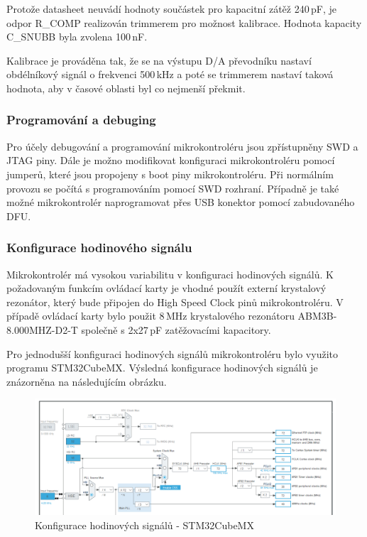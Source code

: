     Protože datasheet neuvádí hodnoty součástek pro kapacitní zátěž 240\,pF, je odpor R\_COMP realizován
    trimmerem pro možnost kalibrace. Hodnota kapacity C\_SNUBB byla zvolena 100\,nF.\par

    Kalibrace je prováděna tak, že se na výstupu D/A převodníku nastaví obdélníkový
    signál o frekvenci 500\,kHz a poté se trimmerem nastaví taková hodnota, aby v časové oblasti
    byl co nejmenší překmit\cite{DAC_stability,OPA_stability}.\par

    \subsubsection{Programování a debuging}
    Pro účely debugování a programování mikrokontroléru jsou zpřístupněny SWD a JTAG piny.
    Dále je možno modifikovat konfiguraci mikrokontroléru pomocí jumperů, které jsou propojeny
    s boot piny mikrokontroléru. Při normálním provozu se počítá s programováním pomocí SWD rozhraní.
    Případně je také možné mikrokontrolér naprogramovat přes USB konektor pomocí zabudovaného DFU.

    \subsubsection{Konfigurace hodinového signálu}
    
    Mikrokontrolér má vysokou variabilitu v konfiguraci hodinových signálů.
    K požadovaným funkcím ovládací karty je vhodné použít externí krystalový rezonátor, který bude
    připojen do High Speed Clock pinů mikrokontroléru. V případě ovládací karty bylo použit 8\,MHz
    krystalového rezonátoru ABM3B-8.000MHZ-D2-T společně s 2x27\,pF zatěžovacími kapacitory.\par


    Pro jednodušší konfiguraci hodinových signálů mikrokontroléru bylo využito programu STM32CubeMX.
    Výsledná konfigurace hodinových signálů je znázorněna na následujícím obrázku.
    \begin{figure}[ht!]
        \centering
        \includegraphics[width = 1\textwidth]{obrazky/CLK_config.png}
        \caption{Konfigurace hodinových signálů - STM32CubeMX}
        \label{fig: Clock configuration}
    \end{figure}

